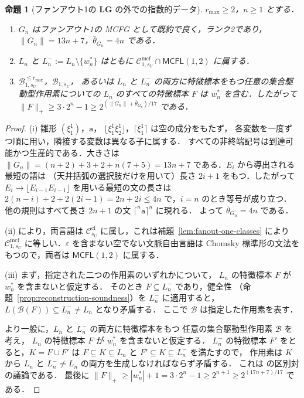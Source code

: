 \documentclass[11pt,a4paper]{ltjsarticle}
\numberwithin{equation}{section}
\theoremstyle{plain}
\newtheorem{proposition}[theorem]{命題}
\theoremstyle{definition}
\theoremstyle{remark}
\newcommand{\Cmcf}[2]{\mathcal{C}^{\mathrm{mcf}}_{#1,#2}}
\newcommand{\eps}{\varepsilon}
\theoremstyle{plain}
\begin{document}
\begin{proposition}[ファンアウト1の $\mathbf{LG}$ の外での指数的データ]
\label{prop:fanout-one-lower}
$r_{\max}\ge2$，$n\ge1$ とする．
\begin{enumerate}[label=\textup{(\roman*)},leftmargin=*]
\item $G_n$ はファンアウト1の MCFG として既約で良く，ランク2であり，
$\|G_n\|=13n+7$，$\bar\theta_{G_n}=4n$ である．
\item $L_n$ と $L_n^-:=L_n\setminus\{w^*_n\}$ はともに
$\Cmcf{1}{s_U}\cap\mathsf{MCFL}(1,2)$ に属する．
\item $\mathcal B^{\le r_{\max}}_{1,s_U}$，$\mathcal B_{1,s_U}$，
あるいは $L_n$ と $L_n^-$ の両方に特徴標本をもつ任意の集合駆動型作用素についての
$L_n$ のすべての特徴標本 $F$ は $w^*_n$ を含む．したがって
$\|F\|_+\ge3\cdot2^n-1\ge2^{(\|G_n\|+\bar\theta_{G_n})/17}$ である．
\end{enumerate}
\end{proposition}

\begin{proof}
(i) 雛形 $(\xi_1^1)$，$\mathtt a$，
$\lfloor\xi_1^1\xi_2^1\rfloor$，$\lceil\xi_1^1\rceil$ は空の成分をもたず，
各変数を一度ずつ順に用い，隣接する変数は異なる子に属する．
すべての非終端記号は到達可能かつ生産的である．大きさは
$\|G_n\|=(n+2)+3+2+n(7+5)=13n+7$ である．$E_i$ から導出される最短の語は
（天井括弧の選択肢だけを用いて）長さ $2i+1$ をもつ．したがって
$E_i\to\lfloor E_{i-1}E_{i-1}\rfloor$ を用いる最短の文の長さは
$2(n-i)+2+2(2i-1)=2n+2i\le4n$ で，$i=n$ のとき等号が成り立つ．
他の規則はすべて長さ $2n+1$ の文 $\lceil^n\mathtt a\rceil^n$ に現れる．
よって $\bar\theta_{G_n}=4n$ である．

(ii) \cite[Proposition~6.4(i),(iv)]{kuriyamaCFG} により，両言語は
$\mathcal C^{\mathrm{cf}}_{s_U}$ に属し，これは補題~\ref{lem:fanout-one-classes}
により $\Cmcf{1}{s_U}$ に等しい．$\eps$ を含まない空でない文脈自由言語は
Chomsky 標準形の文法をもつので，両者は $\mathsf{MCFL}(1,2)$ に属する．

(iii) まず，指定された二つの作用素のいずれかについて，
$L_n$ の特徴標本 $F$ が $w_n^*$ を含まないと仮定する．
そのとき $F\subseteq L_n^-$ であり，健全性
（命題~\ref{prop:reconstruction-soundness}）を $L_n^-$ に適用すると，
$L(\mathcal B(F))\subseteq L_n^-\ne L_n$ となり矛盾する．
ここで $\mathcal B$ は指定した作用素を表す．

より一般に，$L_n$ と $L_n^-$ の両方に特徴標本をもつ
任意の集合駆動型作用素 $\mathcal B$ を考え，
$L_n$ の特徴標本 $F$ が $w_n^*$ を含まないと仮定する．
$L_n^-$ の特徴標本 $F'$ をとると，$K=F\cup F'$ は
$F\subseteq K\subseteq L_n$ と $F'\subseteq K\subseteq L_n^-$ を満たすので，
作用素は $K$ から $L_n$ と $L_n^-\ne L_n$ の両方を生成しなければならず矛盾する．
これは \cite[Proposition~6.4(iv)]{kuriyamaCFG} の区別対の議論である．
最後に
$\|F\|_+\ge|w^*_n|+1=3\cdot2^n-1\ge2^{n+1}\ge2^{(17n+7)/17}$ である．
\end{proof}
\end{document}
